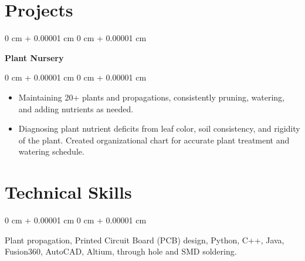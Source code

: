 \documentclass[10pt, letterpaper]{article}
\newenvironment{highlights}{
    \begin{itemize}[
        topsep=0.10 cm,
        parsep=0.10 cm,
        partopsep=0pt,
        itemsep=0pt,
        leftmargin=0 cm + 10pt
    ]
}{
    \end{itemize}
} %
\newenvironment{onecolentry}{
    \begin{adjustwidth}{
        0 cm + 0.00001 cm
    }{
        0 cm + 0.00001 cm
    }
}{
    \end{adjustwidth}
} %
\newenvironment{twocolentry}[2][]{
    \onecolentry
    \def\secondColumn{#2}
    \setcolumnwidth{\fill, 4.5 cm}
    \begin{paracol}{2}
}{
    \switchcolumn \raggedleft \secondColumn
    \end{paracol}
    \endonecolentry
} %
\begin{document}
    
    \section{Projects}



        
        \begin{twocolentry}{
    
        }
            \textbf{Plant Nursery}\end{twocolentry}

        \vspace{0.10 cm}
        \begin{onecolentry}
            \begin{highlights}
                \item Maintaining 20+ plants and propagations, consistently pruning, watering, and adding nutrients as needed.
                \item Diagnosing plant nutrient deficits from leaf color, soil consistency, and rigidity of the plant. Created organizational chart for accurate plant treatment and watering schedule.
            \end{highlights}
        \end{onecolentry}
    
    \section{Technical Skills}

        \begin{onecolentry}
            \item Plant propagation, Printed Circuit Board (PCB) design, Python, C++, Java, Fusion360, AutoCAD, Altium, through hole and SMD soldering.
        \end{onecolentry}
\end{document}
